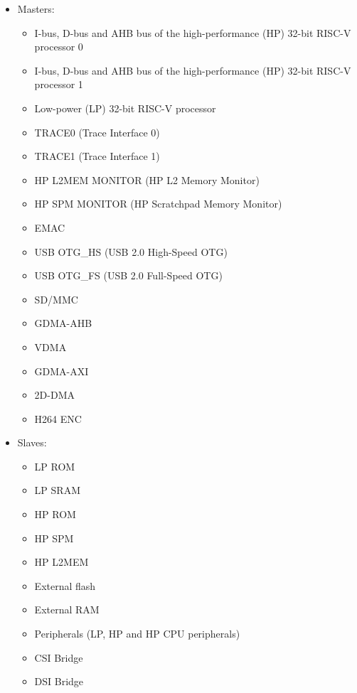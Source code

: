 \documentclass[main\_\_EN.tex]{subfiles}
\begin{document}
\begin{itemize}
    \item Masters:
        \begin{itemize}
            \item I-bus, D-bus and AHB bus of the high-performance (HP) 32-bit RISC-V processor 0
            \item I-bus, D-bus and AHB bus of the high-performance (HP) 32-bit RISC-V processor 1
            \item Low-power (LP) 32-bit RISC-V processor
            \item TRACE0 (Trace Interface 0)
            \item TRACE1 (Trace Interface 1)
            \item HP L2MEM MONITOR (HP L2 Memory Monitor)
            \item HP SPM MONITOR (HP Scratchpad Memory Monitor)
            \item EMAC
            \item USB OTG\_HS (USB 2.0 High-Speed OTG)
            \item USB OTG\_FS (USB 2.0 Full-Speed OTG)
            \item SD/MMC
            \item GDMA-AHB
            \item VDMA
            \item GDMA-AXI
            \item 2D-DMA
            \item H264 ENC
        \end{itemize}
    \item Slaves:
        \begin{itemize}
            \item LP ROM
            \item LP SRAM
            \item HP ROM
            \item HP SPM
            \item HP L2MEM
            \item External flash
            \item External RAM
            \item Peripherals (LP, HP and HP CPU peripherals)
            \item CSI Bridge
            \item DSI Bridge
        \end{itemize}
\end{itemize}
\end{document}

